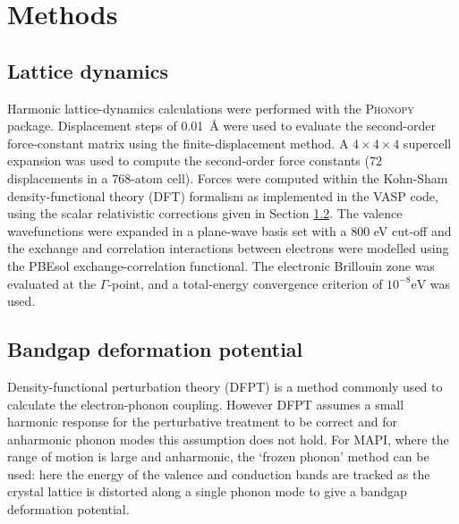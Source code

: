 

\section{Methods}

\subsection{Lattice dynamics}

Harmonic lattice-dynamics calculations were performed with the \textsc{Phonopy} package.\autocite{Togo2015} Displacement steps of \SI{0.01}{\angstrom} were used to evaluate the second-order force-constant matrix using the finite-displacement method. A $4\! \times\! 4\! \times\! 4$ supercell expansion was used to compute the second-order force constants (72 displacements in a 768-atom cell).
Forces were computed within the Kohn-Sham density-functional theory (DFT) formalism as implemented in the \textsc{VASP} code,\autocite{Kresse1996a} using the scalar relativistic corrections given in Section \ref{bgdefmethod}.
The valence wavefunctions were expanded in a plane-wave basis set with a 800 eV cut-off and the exchange and correlation interactions between electrons were modelled using the PBEsol exchange-correlation functional.\autocite{Perdew2008a}
The electronic Brillouin zone was evaluated at the $\Gamma$-point, and a total-energy convergence criterion of $10^{-8}\textrm{eV}$ was used.

\subsection{Bandgap deformation potential} \label{bgdefmethod}

Density-functional perturbation theory (DFPT) is a method commonly used to calculate the electron-phonon coupling. However DFPT assumes a small harmonic response for the perturbative treatment to be correct and for anharmonic phonon modes this assumption does not hold.
For MAPI, where the range of motion is large and anharmonic, the `frozen phonon' method can be used: here the energy of the valence and conduction bands are tracked as the crystal lattice is distorted along a single phonon mode to give a bandgap deformation potential.


